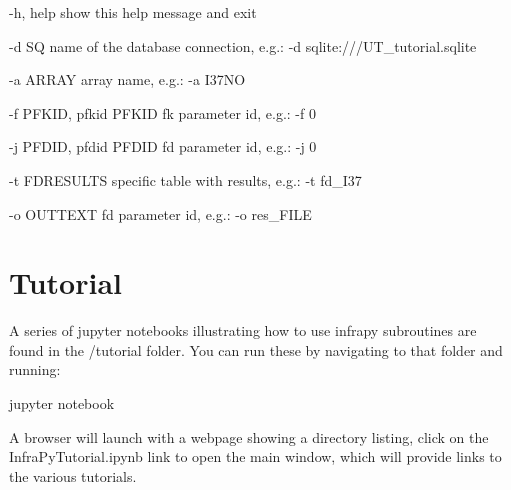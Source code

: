 \documentclass[letterpaper,10pt,english]{sphinxmanual}
\begin{document}
\begin{DUlineblock}{0em}
\item[] -h, \textendash{}help            show this help message and exit
\item[] -d SQ                 name of the database connection, e.g.: -d sqlite:///UT\_tutorial.sqlite
\item[] -a ARRAY              array name, e.g.: -a I37NO
\item[] -f PFKID, \textendash{}pfkid PFKID fk parameter id, e.g.: -f 0
\item[] -j PFDID, \textendash{}pfdid PFDID fd parameter id, e.g.: -j 0
\item[] -t FDRESULTS          specific table with results, e.g.: -t fd\_I37
\item[] -o OUTTEXT            fd parameter id, e.g.: -o res\_FILE
\end{DUlineblock}

\begin{sphinxVerbatim}[commandchars=\\\{\}]
  \PYG{p}{[}\PYG{p}{]}         \PYG{p}{[} \PYG{p}{]} \PYG{p}{[} \PYG{p}{]}
\end{sphinxVerbatim}


\section{Tutorial}
\label{\detokenize{tutorial:tutorial}}\label{\detokenize{tutorial:id1}}\label{\detokenize{tutorial::doc}}
A series of jupyter notebooks illustrating how to use infrapy subroutines are found in the /tutorial folder.
You can run these by navigating to that folder and running:

\begin{sphinxVerbatim}[commandchars=\\\{\}]
\PYGZgt{}\PYGZgt{} jupyter notebook
\end{sphinxVerbatim}

A browser will launch with a webpage showing a directory listing, click on the InfraPyTutorial.ipynb link to open the main window, which will provide links to the various tutorials.
\end{document}

